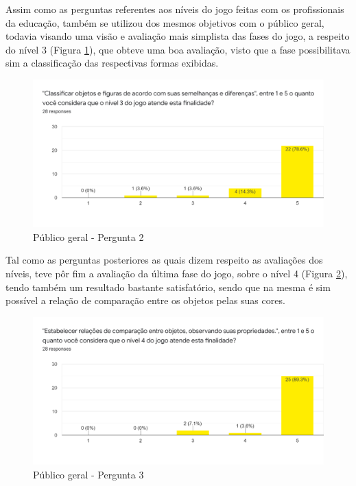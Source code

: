 \documentclass[article,12pt,openany,oneside,a4paper,english,brazil]{abntex2}
\begin{document}
Assim como as perguntas referentes aos níveis do jogo feitas com os profissionais da educação, também se utilizou dos mesmos objetivos com o público geral, todavia visando uma visão e avaliação mais simplista das fases do jogo, a respeito do nível 3 (Figura \ref{fig:aluno_pergunta_2}), que obteve uma boa avaliação, visto que a fase possibilitava sim a classificação das respectivas formas exibidas.

\begin{figure}[H]
    \centering
    \caption{Público geral - Pergunta 2}
    \label{fig:aluno_pergunta_2}
    \includegraphics[width=0.8\linewidth]{SearchResults/Students/Level3.png}
\end{figure}

Tal como as perguntas posteriores as quais dizem respeito as avaliações dos níveis, teve pôr fim a avaliação da última fase do jogo, sobre o nível 4 (Figura \ref{fig:aluno_pergunta_3}), tendo também um resultado bastante satisfatório, sendo que na mesma é sim possível a relação de comparação entre os objetos pelas suas cores.

\begin{figure}[H]
    \centering
    \caption{Público geral - Pergunta 3}
    \label{fig:aluno_pergunta_3}
    \includegraphics[width=0.8\linewidth]{SearchResults/Students/Level4.png}
\end{figure}

\end{document}

